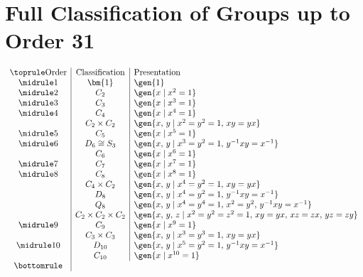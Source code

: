 \section*{Full Classification of Groups up to Order 31}
\begin{displaymath}
\begin{array}{c|c|l}
\toprule
\text{Order} & \text{Classification} & \text{Presentation} \\
\midrule
1 & \bm{1} & \gen{1} \\
\midrule
2 & C_2 & \gen{x \mid x^2 = 1} \\
\midrule
3 & C_3 & \gen{x \mid x^3 = 1} \\
\midrule
4 & C_4 & \gen{x \mid x^4 = 1} \\
  & C_2 \times C_2 & \gen{x,\,y \mid x^2 = y^2 = 1,\, xy = yx} \\
\midrule
5 & C_5 & \gen{x \mid x^5 = 1} \\
\midrule
6 & D_6 \cong S_3 & \gen{x,\,y \mid x^3 = y^2 = 1,\, y^{-1}xy = x^{-1}} \\
  & C_6 & \gen{x \mid x^6 = 1} \\
\midrule
7 & C_7 & \gen{x \mid x^7 = 1} \\
\midrule
8 & C_8 & \gen{x \mid x^8 = 1} \\
  & C_4 \times C_2 & \gen{x,\,y \mid x^4 = y^2 = 1,\, xy = yx} \\
  & D_8 & \gen{x,\,y \mid x^4 = y^2 = 1,\, y^{-1}xy = x^{-1}} \\
  & Q_8 & \gen{x,\,y \mid x^4 = y^4 = 1,\, x^2 = y^2,\, y^{-1}xy = x^{-1}} \\
  & C_2 \times C_2 \times C_2 & \gen{x,\,y,\,z \mid x^2 = y^2 = z^2 = 1,\, xy = yx,\, xz = zx,\, yz = zy} \\
\midrule
9 & C_9 & \gen{x \mid x^9 = 1} \\
  & C_3 \times C_3 & \gen{x,\,y \mid x^3 = y^3 = 1,\, xy = yx} \\
\midrule
10 & D_{10} & \gen{x,\,y \mid x^5 = y^2 = 1,\, y^{-1}xy = x^{-1}} \\
   & C_{10} & \gen{x \mid x^{10} = 1} \\
\bottomrule
\end{array}
\end{displaymath}
\vfill
\pagebreak


